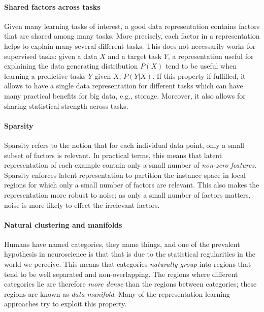 \paragraph{\textbf{Shared factors across tasks}}
Given many learning tasks of interest, a good data representation contains factors that are shared among many tasks.
More precisely, each factor in a representation helps to explain many several different tasks.
This does not necessarily works for supervised tasks: given a data $X$ and a target task $Y$, a representation useful for explaining the data generating distribution $P(X)$ tend to be useful when learning a predictive tasks $Y$ given $X$, $P(Y|X)$.
If this property if fulfilled, it allows to have a single data representation for different tasks which can have many practical benefits for big data, e.g., storage.
Moreover, it also allows for sharing statistical strength across tasks.
 



\paragraph{\textbf{Sparsity}}
Sparsity refers to the notion that for each individual data point, only a small subset of factors is relevant.
In practical terms, this means that latent representation of each example contain only a small number of \textit{non-zero features}.
Sparsity enforces latent representation to partition the instance space in local regions for which only a small number of factors are relevant.
This also makes the representation more robust to noise; as only a small number of factors matters, noise is more likely to effect the irrelevant factors.




\paragraph{\textbf{Natural clustering and manifolds}}
Humans have named categories, they name things, and one of the prevalent hypothesis in neuroscience is that that is due to the statistical regularities in the world we perceive.
This means that categories \textit{naturally group} into regions that tend to be well separated and non-overlapping.
The regions where different categories lie are therefore \textit{more dense} than the regions between categories; these regions are known as \textit{data manifold}.
Many of the representation learning approaches try to exploit this property.

